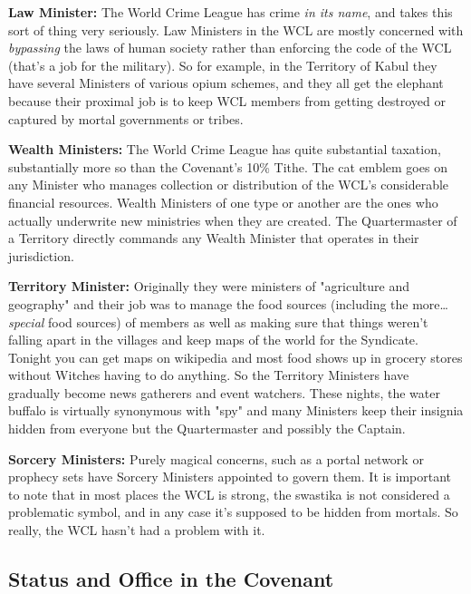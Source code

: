 \textbf{Law Minister:} The World Crime League has crime \textit{in its name}, and takes this sort of thing very seriously. Law Ministers in the WCL are mostly concerned with \textit{bypassing} the laws of human society rather than enforcing the code of the WCL (that's a job for the military). So for example, in the Territory of Kabul they have several Ministers of various opium schemes, and they all get the elephant because their proximal job is to keep WCL members from getting destroyed or captured by mortal governments or tribes.

\textbf{Wealth Ministers:} The World Crime League has quite substantial taxation, substantially more so than the Covenant's 10\% Tithe. The cat emblem goes on any Minister who manages collection or distribution of the WCL's considerable financial resources. Wealth Ministers of one type or another are the ones who actually underwrite new ministries when they are created. The Quartermaster of a Territory directly commands any Wealth Minister that operates in their jurisdiction.

\textbf{Territory Minister:} Originally they were ministers of "agriculture and geography" and their job was to manage the food sources (including the more\ldots{} \textit{special} food sources) of members as well as making sure that things weren't falling apart in the villages and keep maps of the world for the Syndicate. Tonight you can get maps on wikipedia and most food shows up in grocery stores without Witches having to do anything. So the Territory Ministers have gradually become news gatherers and event watchers. These nights, the water buffalo is virtually synonymous with "spy" and many Ministers keep their insignia hidden from everyone but the Quartermaster and possibly the Captain.

\textbf{Sorcery Ministers:} Purely magical concerns, such as a portal network or prophecy sets have Sorcery Ministers appointed to govern them. It is important to note that in most places the WCL is strong, the swastika is not considered a problematic symbol, and in any case it's supposed to be hidden from mortals. So really, the WCL hasn't had a problem with it.

\subsection{Status and Office in the Covenant} 

